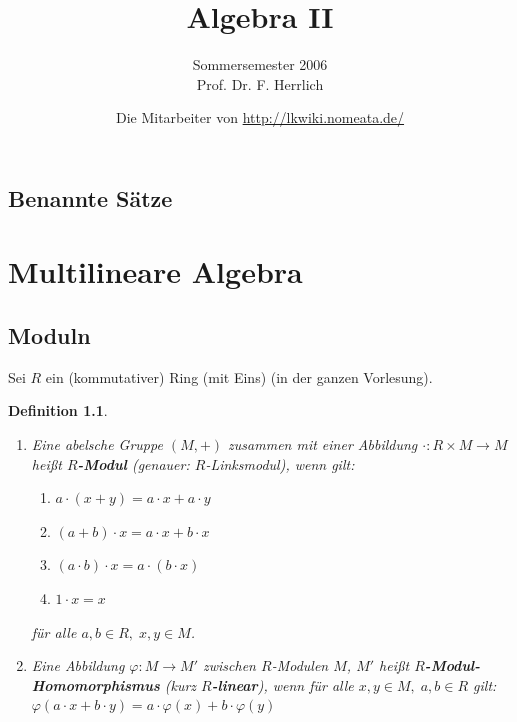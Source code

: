 \documentclass[a4paper,12pt]{scrbook}
\title{Algebra II}
\subtitle{Sommersemester 2006\\ Prof. Dr. F. Herrlich}
\author{Die Mitarbeiter von \url{http://lkwiki.nomeata.de/}}
\theoremstyle{break}
\newtheorem{Def}{Definition}[chapter]
\theoremstyle{nonumberbreak}
\theoremstyle{nonumberplain}
\newcommand{\emp}[1]{\textbf{\emph{#1}}}
\begin{document}
\maketitle

\setlength\parskip{0.6pt}
\tableofcontents

\section*{Benannte Sätze}


\setlength\parskip{\smallskipamount}


\chapter{Multilineare Algebra}

\section{Moduln}

Sei $R$ ein (kommutativer) Ring (mit Eins) (in der ganzen Vorlesung).

\begin{Def}
\label{1.1}
  \begin{enumerate}
    \item Eine abelsche Gruppe $(M,+)$ zusammen mit einer Abbildung
          $\cdot : R \times M \to M$ heißt \emp{$R$-Modul} (genauer:
          $R$-Linksmodul), wenn gilt:
          \begin{enumerate}
            \item[(i)] $a \cdot (x+y) = a \cdot x + a \cdot y$
            \item[(ii)] $(a+b) \cdot x = a \cdot x + b \cdot x$
            \item[(iii)] $(a \cdot b) \cdot x = a \cdot (b \cdot x)$
            \item[(iv)] $1 \cdot x = x$
          \end{enumerate}
          für alle $a,b \in R,\;x,y \in M$.
    \item Eine Abbildung $\varphi: M \to M'$ zwischen $R$-Modulen $M$, $M'$
          heißt \emp{$R$-Modul-Homo\-morphismus} (kurz
          \emp{$R$-linear}), wenn für alle $x,y \in M, \; a,b \in R$
          gilt:\\
          $\varphi (a \cdot x + b \cdot y) = a \cdot \varphi (x) + b \cdot
          \varphi (y)$
  \end{enumerate}
\end{Def}
\end{document}
